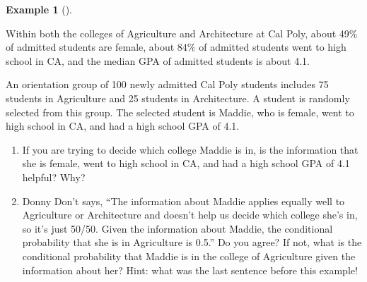 \documentclass[
  letterpaper,
  DIV=11,
  numbers=noendperiod]{scrreprt}
\providecommand{\tightlist}{%
  \setlength{\itemsep}{0pt}\setlength{\parskip}{0pt}}
\theoremstyle{plain}
\theoremstyle{definition}
\newtheorem{example}{Example}[chapter]
\theoremstyle{definition}
\theoremstyle{definition}
\theoremstyle{remark}
\begin{document}
\begin{tcolorbox}[enhanced jigsaw, opacityback=0, left=2mm, colframe=quarto-callout-note-color-frame, toprule=.15mm, breakable, colback=white, leftrule=.75mm, arc=.35mm, rightrule=.15mm, bottomrule=.15mm]

\begin{example}[]\protect\hypertarget{exm-base-rate-neglect}{}\label{exm-base-rate-neglect}

Within both the colleges of Agriculture and Architecture at Cal Poly,
about 49\% of admitted students are female, about 84\% of admitted
students went to high school in CA, and the median GPA of admitted
students is about 4.1.

An orientation group of 100 newly admitted Cal Poly students includes 75
students in Agriculture and 25 students in Architecture. A student is
randomly selected from this group. The selected student is Maddie, who
is female, went to high school in CA, and had a high school GPA of 4.1.

\begin{enumerate}
\def\labelenumi{\arabic{enumi}.}
\tightlist
\item
  If you are trying to decide which college Maddie is in, is the
  information that she is female, went to high school in CA, and had a
  high school GPA of 4.1 helpful? Why?
\item
  Donny Don't says, ``The information about Maddie applies equally well
  to Agriculture or Architecture and doesn't help us decide which
  college she's in, so it's just 50/50. Given the information about
  Maddie, the conditional probability that she is in Agriculture is
  0.5.'' Do you agree? If not, what is the conditional probability that
  Maddie is in the college of Agriculture given the information about
  her? Hint: what was the last sentence before this example!
\end{enumerate}

\end{example}

\end{tcolorbox}
\end{document}
